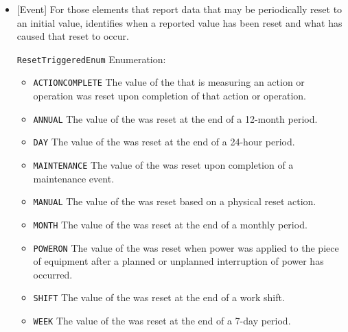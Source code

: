 \begin{itemize}

\item {}[Event] \newline For those  elements that report data that may be periodically reset to an initial value,  identifies when a reported value has been reset and what has caused that reset to occur.

\texttt{ResetTriggeredEnum} Enumeration:

\begin{itemize}
\item \texttt{ACTION\textunderscore COMPLETE} \newline The value of the  that is measuring an action or operation was reset upon completion of that action or operation. 
\item \texttt{ANNUAL} \newline The value of the  was reset at the end of a 12-month period. 
\item \texttt{DAY} \newline The value of the  was reset at the end of a 24-hour period. 
\item \texttt{MAINTENANCE} \newline The value of the  was reset upon completion of a maintenance event. 
\item \texttt{MANUAL} \newline The value of the  was reset based on a physical reset action. 
\item \texttt{MONTH} \newline The value of the  was reset at the end of a monthly period. 
\item \texttt{POWER\textunderscore ON} \newline The value of the  was reset when power was applied to the piece of equipment after a planned or unplanned interruption of power has occurred. 
\item \texttt{SHIFT} \newline The value of the  was reset at the end of a work shift. 
\item \texttt{WEEK} \newline The value of the  was reset at the end of a 7-day period. 
\end{itemize}

\end{itemize}

